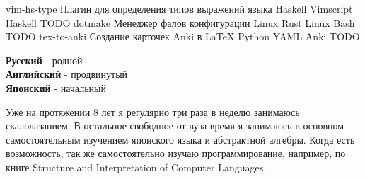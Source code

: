 \documentclass[9pt]{developercv} %
\begin{document}


\begin{entrylist}
    \entry
        {vim-hs-type}
        {Плагин для определения типов выражений языка Haskell}
        {Vimscript \slashsep Haskell}
        {TODO}
    \entry
        {dotmake}
        {Менеджер фалов конфигурации Linux}
        {Rust \slashsep Linux \slashsep Bash}
        {TODO}
    \entry
        {tex-to-anki}
        {Создание карточек Anki в LaTeX}
        {Python \slashsep YAML \slashsep Anki}
        {TODO}
\end{entrylist}


\begin{minipage}[t]{0.3\textwidth}
	\vspace{-\baselineskip} %


	\textbf{Русский} - родной\\
	\textbf{Английский} - продвинутый\\
	\textbf{Японский} - начальный
\end{minipage}
\hfill
\begin{minipage}[t]{0.6\textwidth}
	\vspace{-\baselineskip} %


    Уже на протяжении 8 лет я регулярно три раза в неделю занимаюсь скалолазанием. В остальное свободное от вуза время я занимаюсь в основном самостоятельным изучением японского языка и абстрактной алгебры. Когда есть возможность, так же самостоятельно изучаю программирование, например, по книге Structure and Interpretation of Computer Languages.
\end{minipage}

\end{document}
